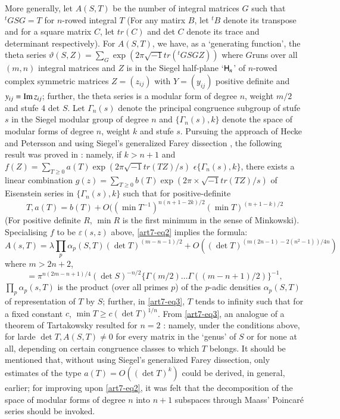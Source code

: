 More generally, let $A(S,T)$ be the number of integral matrices $G$ such that ${}^t G S G = T$ for $n$-rowed integral $T$ (For any matirx $B$, let ${}^t B$ denote its transpose and for a square matrix $C$, let $tr(C)$ and det $C$ denote its trace and determinant respectively). For $A (S, T)$, we have, as a `generating function', the theta series $\vartheta (S, Z)= \sum\limits_G \exp (2 \pi \sqrt{-1} tr ({}^t G S G Z))$ where $G$\pageoriginale runs over all $(m,n)$ integral matrices and $Z$ is in the Siegel half-plane `$\mathsf{H}_n$' of $n$-rowed complex symmetric matrices $Z = (z_{ij})$ with $Y= (y_{ij})$ positive definite and $y_{ij} = \operatorname{Im} z_{ij}$; further, the theta series is a modular form of degree $n$, weight $m/2$ and stufe 4 det $S$. Let $\Gamma_n(s)$ denote the principal congruence subgroup of stufe $s$ in the Siegel modular group of degree $n$ and $\{\Gamma_n (s), k\}$ denote the space of modular forms of degree $n$, weight $k$ and stufe $s$. Pursuing the approach of Hecke and Petersson and using Siegel's generalized Farey dissection \cite{art7-S}, the following result was proved in \cite{art7-R}: namely, if $k > n+1$ and $f(Z) = \sum\limits_{T \geq 0} a(T) \exp (2 \pi \sqrt{-1} tr (TZ)/s)$ $\epsilon \{\Gamma_n (s), k\}$, there exists a linear combination $g(z) = \sum\limits_{T \geq 0} b(T) \exp (2 \pi \times \sqrt{-1} tr (TZ)/s)$ of Eisenstein series in $\{\Gamma_n (s), k\}$ such that for positive-definite
\begin{equation}
T, a(T) = b(T) + O((\min T^{-1})^{n(n+1-2k)/2} (\min T)^{(n+1-k)/2} \label{art7-eq2}
\end{equation}
(For positive definite $R$, $\min R$ is the first minimum in the sense of Minkowski). Specialising $f$ to be $\varepsilon(s,z)$ above, \eqref{art7-eq2} implies the formula:
\begin{equation}
A (s, T) = \lambda \prod\limits_{p} \alpha_p  (S, T) (\det T)^{(m-n-1)/2} + O ((\det T)^{(m (2n -1) -2 (n^2 -1)) / 4n}) \label{art7-eq3}
\end{equation}
where $m > 2 n + 2$, 
$$
= \pi^{n (2m-n+1)/4} (\det S)^{-n/2} \{\Gamma (m/2) \ldots \Gamma((m - n +1)/2)\}^{-1}, 
$$
$\prod\limits_p \alpha_p (s, T)$ is the product (over all primes $p$) of the $p$-adic densities $\alpha_p (S,T)$ of representation of $T$ by $S$; further, in \eqref{art7-eq3}, $T$ tends to infinity such that for a fixed constant $c$, $\min T \geqslant c (\det T)^{1/n}$. From \eqref{art7-eq3}, an analogue of a theorem of Tartakowsky resulted for $n = 2$ \cite{art7-R}: namely, under the conditions above, for larde $\det T, A (S, T) \neq 0$ for every matrix in the `genus' of $S$ or for none at all, depending on certain congruence classes to which $T$ belongs. It should be mentioned that, without using Siegel's generalized Farey dissection, only estimates of the type $a (T) = O((\det T)^k)$ could be derived, in general, earlier; for improving upon \eqref{art7-eq2}, it was felt that the decomposition of the space of modular forms of degree $n$ into $n+1$ subspaces through Maass' Poincar\'e series should be invoked. 

